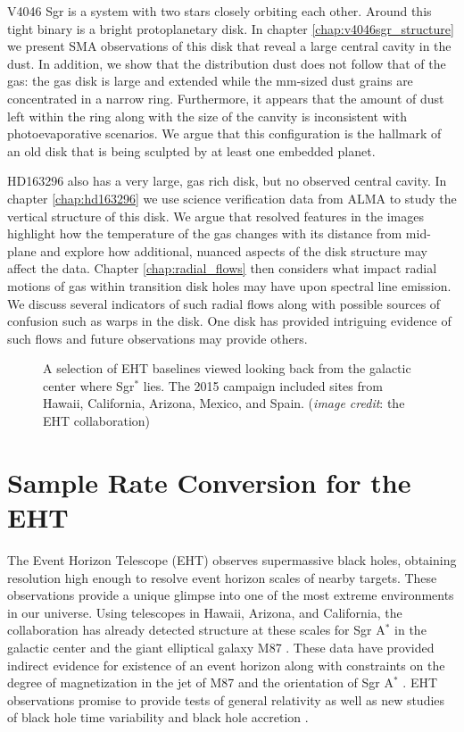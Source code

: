 V4046 Sgr is a system with two stars closely orbiting each other.  Around this tight binary is a bright
protoplanetary disk.  In chapter \ref{chap:v4046sgr_structure} we present SMA observations 
of this disk that reveal a large central cavity in the dust.  In addition, we show that the distribution dust 
does not follow that of the gas: the gas disk is large and extended while the 
mm-sized dust grains are concentrated in a narrow ring.  Furthermore, it appears that the amount of dust left 
within the ring along with the size of the canvity is inconsistent with photoevaporative scenarios.  We argue 
that this configuration is the hallmark of an old disk that is being sculpted by at least one embedded planet.  

HD163296 also has a very large, gas rich disk, but no observed central cavity.  In chapter \ref{chap:hd163296} 
we use science verification data from ALMA to study the vertical structure of 
this disk.  We argue that resolved features in the images highlight how the temperature of the gas changes with
its distance from mid-plane and explore how additional, nuanced aspects of the disk structure may affect
the data.  Chapter \ref{chap:radial_flows} then considers what impact radial motions of gas within transition 
disk holes may have upon spectral line emission.  We discuss several indicators of such radial flows along 
with possible sources of confusion such as warps in the disk.  One disk has provided intriguing
evidence of such flows \citep{casassus13,cassasus15} and future observations may provide others.

\begin{figure}[t]
\caption{A selection of EHT baselines viewed looking back from the galactic center where Sgr$^\ast$ lies.  The 
2015 campaign included sites 
from Hawaii, California, Arizona, Mexico, and Spain. ({\it image credit}: the EHT collaboration)}
\end{figure}

\section{Sample Rate Conversion for the EHT}

The Event Horizon Telescope (EHT) observes supermassive black holes, obtaining resolution high enough
to resolve event horizon scales of nearby targets.  These observations provide a 
unique glimpse into one of the most extreme environments in our universe.  Using telescopes in Hawaii, Arizona, 
and California, the collaboration has already detected structure at these scales for Sgr A$^\ast$ in the galactic 
center and the giant elliptical galaxy M87 \citep{doeleman08,doeleman09}.  These data have provided indirect 
evidence for existence of an event horizon \citep{broderick15} along with constraints on the degree of 
magnetization in the jet of M87 \citep{kino15} and the orientation of Sgr A$^\ast$ \citep{broderick11}.  EHT 
observations promise to provide tests of general relativity \citep{luminet79,johannsen10,bambi13,broderick14} as 
well as new studies of black hole time variability \citep{doeleman09} and black hole accretion \citep{chan15}.


